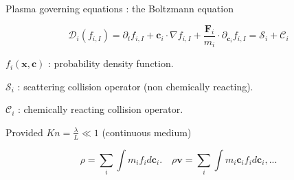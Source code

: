 \documentclass[24pt,t,table, aspectratio=169]{beamer}
\newcommand{\vecv}{\mathbf{v}}
\newcommand{\vecc}{\mathbf{c}}
\begin{document}
\begin{frame}{Plasma governing equations : the Boltzmann equation}

\begin{framed}
\begin{equation*}
\mathcal{D}_{i}(f_{i,I}) = \partial_t f_{i,I} + \mathbf{c}_i \cdot \nabla f_{i,I} + \frac{\mathbf{F}_i}{m_i}\cdot \partial_{\mathbf{c}_{i}} f_{i,I} = \mathcal{S}_{i} + \mathcal{C}_{i}
\end{equation*}
\end{framed}

$f_i(\mathbf{x}, \mathbf{c})$ : probability density function. 

$\mathcal{S}_i$ : scattering collision operator (non chemically reacting).

$\mathcal{C}_i$ : chemically reacting collision operator.

Provided $Kn = \frac{\lambda}{L} \ll 1$ (continuous medium)

\begin{equation*}
\rho = \sum_{i}\int m_i f_i d \vecc_i. \quad \rho \vecv = \sum_i \int m_i \vecc_i f_i d \vecc_i, ... 
\end{equation*}

\end{frame}
\end{document}
